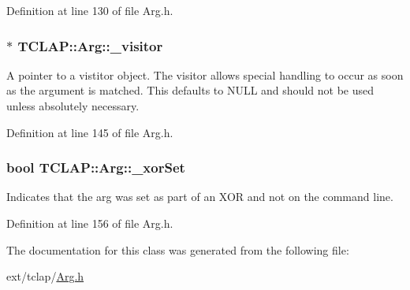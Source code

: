 Definition at line 130 of file Arg.\+h.

\hypertarget{class_t_c_l_a_p_1_1_arg_aa9ff037e92c9fa5bd85e532f61899300}{}
\subsubsection[{\+\_\+visitor}]{$\ast$ T\+C\+L\+A\+P\+::\+Arg\+::\+\_\+visitor\hspace{0.3cm}{\ttfamily [protected]}}\label{class_t_c_l_a_p_1_1_arg_aa9ff037e92c9fa5bd85e532f61899300}
A pointer to a vistitor object. The visitor allows special handling to occur as soon as the argument is matched. This defaults to N\+U\+L\+L and should not be used unless absolutely necessary. 

Definition at line 145 of file Arg.\+h.

\hypertarget{class_t_c_l_a_p_1_1_arg_ab413bd1d8a7ecf3c89672ee23ef791ba}{}
\subsubsection[{\+\_\+xor\+Set}]{\setlength{\rightskip}{0pt plus 5cm}bool T\+C\+L\+A\+P\+::\+Arg\+::\+\_\+xor\+Set\hspace{0.3cm}{\ttfamily [protected]}}\label{class_t_c_l_a_p_1_1_arg_ab413bd1d8a7ecf3c89672ee23ef791ba}
Indicates that the arg was set as part of an X\+O\+R and not on the command line. 

Definition at line 156 of file Arg.\+h.



The documentation for this class was generated from the following file\+:\begin{DoxyCompactItemize}
\item 
ext/tclap/\hyperlink{_arg_8h}{Arg.\+h}\end{DoxyCompactItemize}
